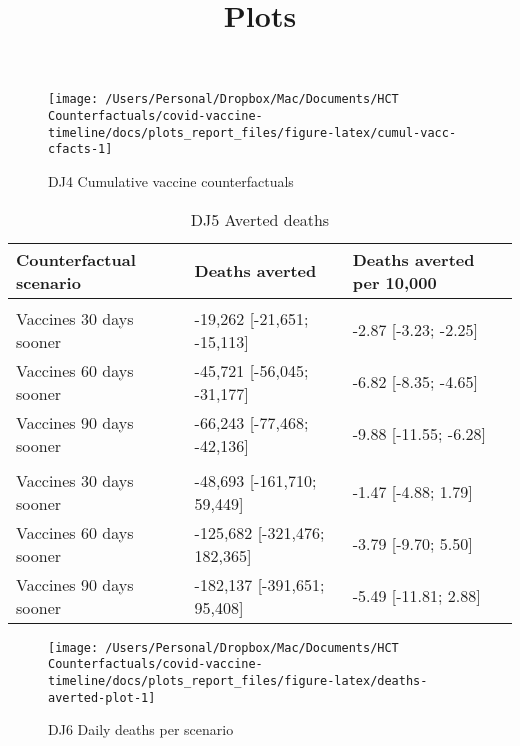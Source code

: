 \documentclass[
  12pt,
]{article}
\title{Plots}
\author{}
\date{\vspace{-2.5em}}
\begin{document}
\maketitle

\begin{figure}

{\centering \texttt{[image: /Users/Personal/Dropbox/Mac/Documents/HCT Counterfactuals/covid-vaccine-timeline/docs/plots\_report\_files/figure-latex/cumul-vacc-cfacts-1]} 

}

\caption{DJ4 Cumulative vaccine counterfactuals}\label{fig:cumul-vacc-cfacts}
\end{figure}

\begin{table}

\caption{\label{tab:deaths-averted-table}DJ5 Averted deaths}
\centering
\begin{tabular}[t]{lll}
\toprule
Counterfactual scenario & Deaths averted & Deaths averted per 10,000\\
\midrule
\addlinespace[0.3em]
\multicolumn{3}{l}{\textbf{United Kingdom}}\\
\hspace{1em}Vaccines 30 days sooner & -19,262 [-21,651; -15,113] & -2.87 [-3.23; -2.25]\\
\hspace{1em}Vaccines 60 days sooner & -45,721 [-56,045; -31,177] & -6.82 [-8.35; -4.65]\\
\hspace{1em}Vaccines 90 days sooner & -66,243 [-77,468; -42,136] & -9.88 [-11.55; -6.28]\\
\addlinespace[0.3em]
\multicolumn{3}{l}{\textbf{United States}}\\
\hspace{1em}Vaccines 30 days sooner & -48,693 [-161,710; 59,449] & -1.47 [-4.88; 1.79]\\
\hspace{1em}Vaccines 60 days sooner & -125,682 [-321,476; 182,365] & -3.79 [-9.70; 5.50]\\
\hspace{1em}Vaccines 90 days sooner & -182,137 [-391,651; 95,408] & -5.49 [-11.81; 2.88]\\
\bottomrule
\end{tabular}
\end{table}

\begin{figure}

{\centering \texttt{[image: /Users/Personal/Dropbox/Mac/Documents/HCT Counterfactuals/covid-vaccine-timeline/docs/plots\_report\_files/figure-latex/deaths-averted-plot-1]} 

}

\caption{DJ6 Daily deaths per scenario}\label{fig:deaths-averted-plot}
\end{figure}
\end{document}
